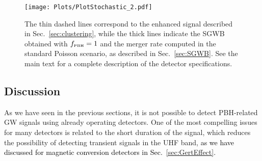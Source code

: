 \documentclass[11pt,a4paper]{article}
\begin{document}
\begin{figure}[t!]
\centering
\texttt{[image: Plots/PlotStochastic\_2.pdf]}
\caption{
 The thin dashed lines correspond to the enhanced signal described in Sec.~\ref{sec:clustering}, while the thick lines indicate the SGWB obtained with $f_\text{\tiny  PBH} = 1$ and the merger rate computed in the standard Poisson scenario, as described in Sec.~\ref{sec:SGWB}. 
 See the main text for a complete description of the detector specifications.
%
}\label{fig:PlotStochastic}
\end{figure}


\subsection{Discussion}
\label{sec:Discussion}

As we have seen in the previous sections, it is not possible to detect PBH-related GW signals using already operating detectors. One of the most compelling issues for many detectors is related to the short duration of the signal, which reduces the possibility of detecting transient signals in the UHF band, \textcolor{black}{as we have discussed for magnetic conversion detectors in Sec.~\ref{sec:GertEffect}.}%
\end{document}
